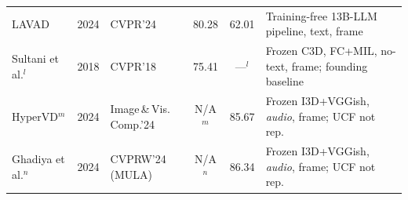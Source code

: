 \begin{table}[t]
\begin{tabular}{l c l c c l}
LAVAD                      & 2024 & CVPR'24           & 80.28 & 62.01 & Training-free 13B-LLM pipeline, text, frame \\ %
Sultani et al.$^{l}$       & 2018 & CVPR'18           & 75.41 & ---$^{l}$ & Frozen C3D, FC+MIL, no-text, frame; founding baseline \\ %
HyperVD$^{m}$              & 2024 & Image\,\&\,Vis.\,Comp.'24 & N/A$^{m}$ & 85.67 & Frozen I3D+VGGish, \emph{audio}, frame; UCF not rep. \\ %
Ghadiya et al.$^{n}$       & 2024 & CVPRW'24 (MULA)   & N/A$^{n}$ & 86.34 & Frozen I3D+VGGish, \emph{audio}, frame; UCF not rep. \\ %
\bottomrule
\end{tabular}


\end{table}
